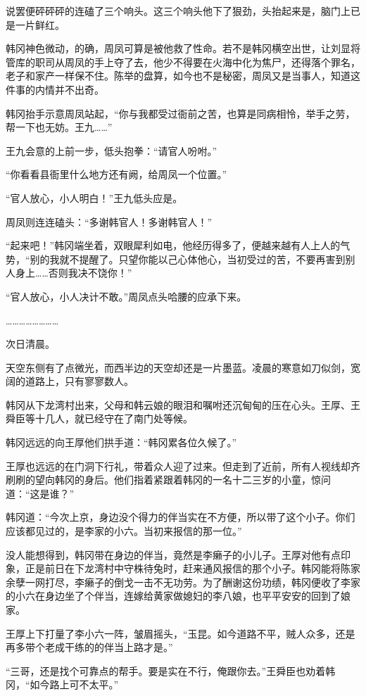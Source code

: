 说罢便砰砰砰的连磕了三个响头。这三个响头他下了狠劲，头抬起来是，脑门上已是一片鲜红。

韩冈神色微动，的确，周凤可算是被他救了性命。若不是韩冈横空出世，让刘显将管库的职司从周凤的手上夺了去，他少不得要在火海中化为焦尸，还得落个罪名，老子和家产一样保不住。陈举的盘算，如今也不是秘密，周凤又是当事人，知道这件事的内情并不出奇。

韩冈抬手示意周凤站起，“你与我都受过衙前之苦，也算是同病相怜，举手之劳，帮一下也无妨。王九……”

王九会意的上前一步，低头抱拳：“请官人吩咐。”

“你看看县衙里什么地方还有阙，给周凤一个位置。”

“官人放心，小人明白！”王九低头应是。

周凤则连连磕头：“多谢韩官人！多谢韩官人！”

“起来吧！”韩冈端坐着，双眼犀利如电，他经历得多了，便越来越有人上人的气势，“别的我就不提醒了。只望你能以己心体他心，当初受过的苦，不要再害到别人身上……否则我决不饶你！”

“官人放心，小人决计不敢。”周凤点头哈腰的应承下来。

……………………

次日清晨。

天空东侧有了点微光，而西半边的天空却还是一片墨蓝。凌晨的寒意如刀似剑，宽阔的道路上，只有寥寥数人。

韩冈从下龙湾村出来，父母和韩云娘的眼泪和嘱咐还沉甸甸的压在心头。王厚、王舜臣等十几人，就已经守在了南门处等候。

韩冈远远的向王厚他们拱手道：“韩冈累各位久候了。”

王厚也远远的在门洞下行礼，带着众人迎了过来。但走到了近前，所有人视线却齐刷刷的望向韩冈的身后。他们指着紧跟着韩冈的一名十二三岁的小童，惊问道：“这是谁？”

韩冈道：“今次上京，身边没个得力的伴当实在不方便，所以带了这个小子。你们应该都见过的，是李家的小六。当初来报信的那一位。”

没人能想得到，韩冈带在身边的伴当，竟然是李癞子的小儿子。王厚对他有点印象，正是前日在下龙湾村中守株待兔时，赶来通风报信的那个小子。韩冈能将陈家余孽一网打尽，李癞子的倒戈一击不无功劳。为了酬谢这份功绩，韩冈便收了李家的小六在身边坐了个伴当，连嫁给黄家做媳妇的李八娘，也平平安安的回到了娘家。

王厚上下打量了李小六一阵，皱眉摇头，“玉昆。如今道路不平，贼人众多，还是再多带个老成干练的的伴当上路才是。”

“三哥，还是找个可靠点的帮手。要是实在不行，俺跟你去。”王舜臣也劝着韩冈，“如今路上可不太平。”

